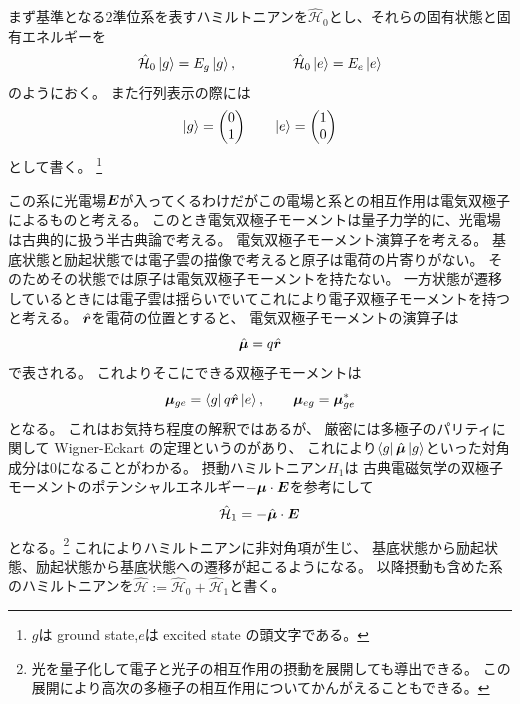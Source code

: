 \documentclass[11pt,dvipdfmx,a4paper]{jsarticle}
\begin{document}
まず基準となる2準位系を表すハミルトニアンを\(\hat{\mathcal{H}}_0\)とし、それらの固有状態と固有エネルギーを
\begin{equation}
	\hat{\mathcal{H}}_0 \ket{g} = E_g \ket{g}, \qquad \qquad \hat{\mathcal{H}}_0 \ket{e} = E_e \ket{e}
\end{equation}
のようにおく。
また行列表示の際には
\begin{equation}
	\ket{g} =
	\begin{pmatrix}
		0\\
		1
	\end{pmatrix}
	\qquad
	\ket{e} =
	\begin{pmatrix}
		1 \\
		0
	\end{pmatrix}
\end{equation}
として書く。
\footnote{\(g\)は ground state,\(e\)は excited state の頭文字である。}

この系に光電場\(\vb*{E}\)が入ってくるわけだがこの電場と系との相互作用は電気双極子によるものと考える。
このとき電気双極子モーメントは量子力学的に、光電場は古典的に扱う半古典論で考える。
電気双極子モーメント演算子を考える。
基底状態と励起状態では電子雲の描像で考えると原子は電荷の片寄りがない。
そのためその状態では原子は電気双極子モーメントを持たない。
一方状態が遷移しているときには電子雲は揺らいでいてこれにより電子双極子モーメントを持つと考える。
\(\hat{\vb*{r}}\)を電荷の位置とすると、
電気双極子モーメントの演算子は
\begin{equation}
	\hat{\vb*{\mu}} = q \hat{\vb*{r}}
\end{equation}
で表される。
これよりそこにできる双極子モーメントは
\begin{equation}
	\vb*{\mu}_{ge} = \bra{g}q\hat{\vb*{r}}\ket{e},\qquad \vb*{\mu}_{eg} = \vb*{\mu}_{ge}^{*}
\end{equation}
となる。
これはお気持ち程度の解釈ではあるが、
厳密には多極子のパリティに関して Wigner-Eckart の定理というのがあり、
これにより\(\bra{g}\hat{\vb*{\mu}}\ket{g}\)といった対角成分は\(0\)になることがわかる。
摂動ハミルトニアン\(H_1\)は
古典電磁気学の双極子モーメントのポテンシャルエネルギー\(-\vb*{\mu}\cdot\vb*{E}\)を参考にして
\begin{equation}
	\hat{\mathcal{H}}_1 = - \hat{\vb*{\mu}}\cdot\vb*{E}
\end{equation}
となる。\footnote{光を量子化して電子と光子の相互作用の摂動を展開しても導出できる。
この展開により高次の多極子の相互作用についてかんがえることもできる。}
これによりハミルトニアンに非対角項が生じ、
基底状態から励起状態、励起状態から基底状態への遷移が起こるようになる。
以降摂動も含めた系のハミルトニアンを\(\hat{\mathcal{H}} := \hat{\mathcal{H}}_0 + \hat{\mathcal{H}}_1\)と書く。
\end{document}
